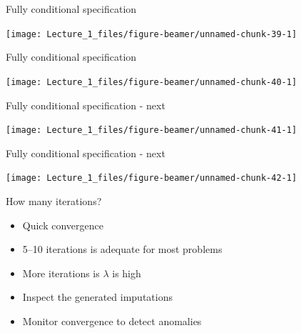 \documentclass[ignorenonframetext,aspectratio=43]{beamer}
\providecommand{\tightlist}{%
  \setlength{\itemsep}{0pt}\setlength{\parskip}{0pt}}
\begin{document}
\begin{frame}{Fully conditional specification}
\protect\hypertarget{fully-conditional-specification-3}{}

\begin{center}\texttt{[image: Lecture\_1\_files/figure-beamer/unnamed-chunk-39-1]} \end{center}

\end{frame}

\begin{frame}{Fully conditional specification}
\protect\hypertarget{fully-conditional-specification-4}{}

\begin{center}\texttt{[image: Lecture\_1\_files/figure-beamer/unnamed-chunk-40-1]} \end{center}

\end{frame}

\begin{frame}{Fully conditional specification - next}
\protect\hypertarget{fully-conditional-specification---next}{}

\begin{center}\texttt{[image: Lecture\_1\_files/figure-beamer/unnamed-chunk-41-1]} \end{center}

\end{frame}

\begin{frame}{Fully conditional specification - next}
\protect\hypertarget{fully-conditional-specification---next-1}{}

\begin{center}\texttt{[image: Lecture\_1\_files/figure-beamer/unnamed-chunk-42-1]} \end{center}

\end{frame}

\begin{frame}{How many iterations?}
\protect\hypertarget{how-many-iterations}{}

\begin{itemize}
\tightlist
\item
  Quick convergence
\item
  5--10 iterations is adequate for most problems
\item
  More iterations is \(\lambda\) is high
\item
  Inspect the generated imputations
\item
  Monitor convergence to detect anomalies
\end{itemize}

\end{frame}
\end{document}

